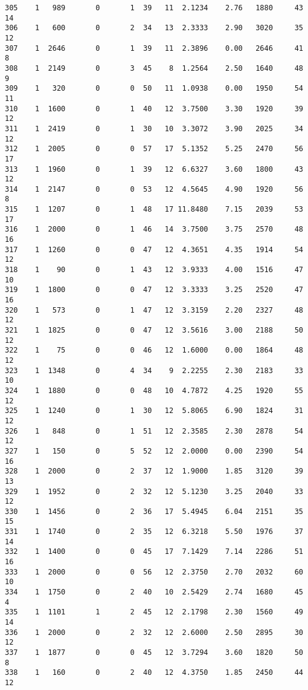 \documentclass[
  letterpaper,
  DIV=11,
  numbers=noendperiod]{scrreprt}
\begin{document}
\begin{verbatim}
305    1   989       0       1  39   11  2.1234    2.76   1880     43      14
306    1   600       0       2  34   13  2.3333    2.90   3020     35      12
307    1  2646       0       1  39   11  2.3896    0.00   2646     41       8
308    1  2149       0       3  45    8  1.2564    2.50   1640     48       9
309    1   320       0       0  50   11  1.0938    0.00   1950     54      11
310    1  1600       0       1  40   12  3.7500    3.30   1920     39      12
311    1  2419       0       1  30   10  3.3072    3.90   2025     34      12
312    1  2005       0       0  57   17  5.1352    5.25   2470     56      17
313    1  1960       0       1  39   12  6.6327    3.60   1800     43      12
314    1  2147       0       0  53   12  4.5645    4.90   1920     56       8
315    1  1207       0       1  48   17 11.8480    7.15   2039     53      17
316    1  2000       0       1  46   14  3.7500    3.75   2570     48      16
317    1  1260       0       0  47   12  4.3651    4.35   1914     54      12
318    1    90       0       1  43   12  3.9333    4.00   1516     47      10
319    1  1800       0       0  47   12  3.3333    3.25   2520     47      16
320    1   573       0       1  47   12  3.3159    2.20   2327     48      12
321    1  1825       0       0  47   12  3.5616    3.00   2188     50      12
322    1    75       0       0  46   12  1.6000    0.00   1864     48      12
323    1  1348       0       4  34    9  2.2255    2.30   2183     33      10
324    1  1880       0       0  48   10  4.7872    4.25   1920     55      12
325    1  1240       0       1  30   12  5.8065    6.90   1824     31      12
326    1   848       0       1  51   12  2.3585    2.30   2878     54      12
327    1   150       0       5  52   12  2.0000    0.00   2390     54      16
328    1  2000       0       2  37   12  1.9000    1.85   3120     39      13
329    1  1952       0       2  32   12  5.1230    3.25   2040     33      12
330    1  1456       0       2  36   17  5.4945    6.04   2151     35      15
331    1  1740       0       2  35   12  6.3218    5.50   1976     37      14
332    1  1400       0       0  45   17  7.1429    7.14   2286     51      16
333    1  2000       0       0  56   12  2.3750    2.70   2032     60      10
334    1  1750       0       2  40   10  2.5429    2.74   1680     45       4
335    1  1101       1       2  45   12  2.1798    2.30   1560     49      14
336    1  2000       0       2  32   12  2.6000    2.50   2895     30      12
337    1  1877       0       0  45   12  3.7294    3.60   1820     50       8
338    1   160       0       2  40   12  4.3750    1.85   2450     44      12

\end{verbatim}
\end{document}
